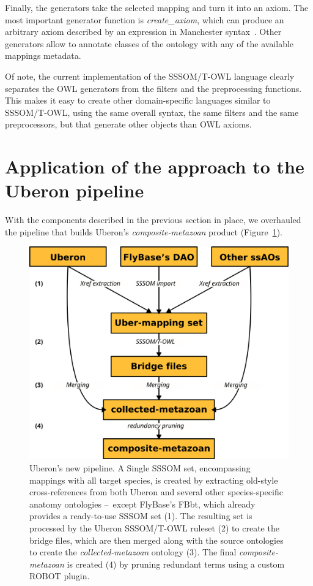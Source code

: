 \documentclass{ceurart}
\def\function#1{\textit{#1}}
\begin{document}
Finally, the generators take the selected mapping and turn it into an axiom.
The most important generator function is \function{create\_axiom}, which can
produce an arbitrary axiom described by an expression in Manchester
syntax~\cite{patel-schneider2012}. Other generators allow to annotate classes
of the ontology with any of the available mappings metadata.

Of note, the current implementation of the SSSOM/T-OWL language clearly
separates the OWL generators from the filters and the preprocessing
functions. This makes it easy to create other domain-specific languages
similar to SSSOM/T-OWL, using the same overall syntax, the same filters
and the same preprocessors, but that generate other objects than OWL
axioms.

\section{Application of the approach to the Uberon pipeline}

With the components described in the previous section in place, we
overhauled the pipeline that builds Uberon's \emph{composite-metazoan}
product (Figure~\ref{fig:pipeline}).

\begin{figure}
  \centering
  \includegraphics[width=.4\linewidth]{figs/pipeline}
  \caption{Uberon's new pipeline. A Single SSSOM set, encompassing
  mappings with all target species, is created by extracting
  old-style cross-references from both Uberon and several other
  species-specific anatomy ontologies --~except FlyBase's FBbt, which
  already provides a ready-to-use SSSOM set (1). The resulting set is
  processed by the Uberon SSSOM/T-OWL ruleset (2) to create the bridge
  files, which are then merged along with the source ontologies to
  create the \emph{collected-metazoan} ontology (3). The final
  \emph{composite-metazoan} is created (4) by pruning redundant terms
  using a custom ROBOT plugin.}
  \label{fig:pipeline}
\end{figure}
\end{document}
